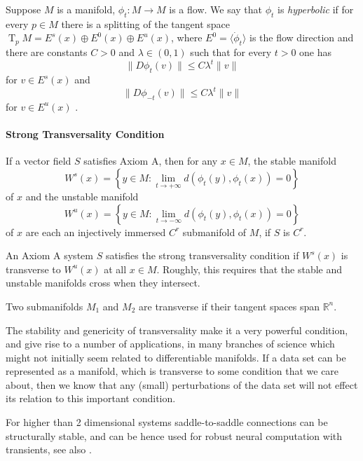 \documentclass{article}
\newcommand{\T}{\operatorname{T}}
\newcommand{\TpM}{\T_p\!M}
\newcounter{ct}
\begin{document}
\begin{definition}
 Suppose $M$ is a manifold, $\phi_t\colon M\rightarrow M$ is a flow.
  We say that $\phi_t$ is \emph{hyperbolic} %
   if for every $p\in M$ there is a splitting of the tangent space $\TpM=E^s(x)\oplus E^0(x)\oplus E^u(x)$, where $E^0=\langle \dot\phi_t\rangle$ is the flow direction and there are constants $C>0$ and $\lambda\in(0,1)$ such that for every $t>0$ one has \[\|D\phi_t(v)\|\leq C\lambda^t\|v\|\]
for $v\in E^s(x)$ and \[\|D\phi_{-t}(v)\|\leq C\lambda^t\|v\|\] for $v\in E^u(x)$ . 
\end{definition}

\paragraph{Strong Transversality Condition}

If a vector field $S$ satisfies Axiom A, then for any $x \in M$, the stable manifold 
\[W^s(x)=\left\{ y \in M \colon \lim_{t\rightarrow+\infty} d(\phi_t( y), \phi_t(x))=0\right\}\]
of $x$ and the unstable manifold
\[W^u(x)=\left\{ y \in M \colon \lim_{t\rightarrow-\infty} d(\phi_t( y), \phi_t(x))=0\right\}\]
of $x$ are each an injectively immersed $C^r$ submanifold of $M$, if $S$ is $C^r$.

An Axiom A system $S$ satisfies the strong transversality condition if $W^s(x)$ is transverse to $W^u(x)$ at all $x\in M$.
Roughly, this requires that the stable and unstable manifolds cross when they intersect. 

Two submanifolds $M_1$ and $M_2$ are transverse if their tangent spaces span $\mathbb{R}^n$.

\begin{remark}
The stability and genericity of transversality make it a very powerful condition, and give rise to a number of applications, in many branches of science which might not initially seem related to
differentiable manifolds. If a data set can be represented as a manifold, which is transverse to some condition that we care about, then we know that any (small) perturbations of the data set will not effect its relation to this important condition.
\end{remark}


\begin{remark}
For higher than 2 dimensional systems saddle-to-saddle connections can be structurally stable, and can be hence used for robust neural computation with transients, see also \cite{rabinovich2008transient}.
\end{remark}
\end{document}
